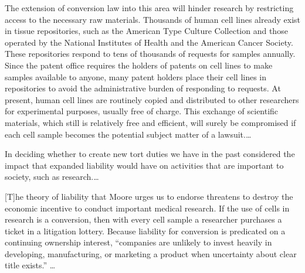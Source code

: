 The extension of conversion law into this area will hinder research by
restricting access to the necessary raw materials. Thousands of human cell
lines already exist in tissue repositories, such as the American Type Culture
Collection and those operated by the National Institutes of Health and the
American Cancer Society. These repositories respond to tens of thousands of
requests for samples annually. Since the patent office requires the holders of
patents on cell lines to make samples available to anyone, many patent holders
place their cell lines in repositories to avoid the administrative burden of
responding to requests. At present, human cell lines are routinely copied and
distributed to other researchers for experimental purposes, usually free of
charge. This exchange of scientific materials, which still is relatively free
and efficient, will surely be compromised if each cell sample becomes the
potential subject matter of a lawsuit.{\dots}

In deciding whether to create new tort duties we have in the past considered the
impact that expanded liability would have on activities that are important to
society, such as research.{\dots}

[T]he theory of liability that Moore urges us to endorse threatens to destroy
the economic incentive to conduct important medical research. If the use of
cells in research is a conversion, then with every cell sample a researcher
purchases a ticket in a litigation lottery. Because liability for conversion is
predicated on a continuing ownership interest, ``companies are unlikely to
invest heavily in developing, manufacturing, or marketing a product when
uncertainty about clear title exists.''
{\dots}

